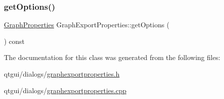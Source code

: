 \mbox{\label{class_graph_export_properties_acd1307a08d8af201591f5c240da42a59}} 
\subsubsection{\texorpdfstring{getOptions()}{getOptions()}}
{\footnotesize\ttfamily \mbox{\hyperlink{struct_graph_properties}{Graph\+Properties}} Graph\+Export\+Properties\+::get\+Options (\begin{DoxyParamCaption}{ }\end{DoxyParamCaption}) const}



The documentation for this class was generated from the following files\+:\begin{DoxyCompactItemize}
\item 
qtgui/dialogs/\mbox{\hyperlink{graphexportproperties_8h}{graphexportproperties.\+h}}\item 
qtgui/dialogs/\mbox{\hyperlink{graphexportproperties_8cpp}{graphexportproperties.\+cpp}}\end{DoxyCompactItemize}
